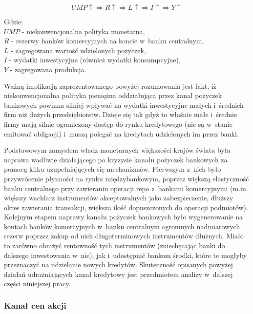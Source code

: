 \begin{equation}
UMP\uparrow \Longrightarrow R\uparrow \Longrightarrow L\uparrow \Longrightarrow I\uparrow \Longrightarrow Y\uparrow	
\end{equation}
\vspace{-1cm}
\begin{adjustwidth}{2.5em}{0pt}
{\footnotesize Gdzie:  \\
$UMP$ - niekonwencjonalna polityka monetarna, \\
$R$ - rezerwy banków komercyjnych na koncie w~banku centralnym, \\
$L$ - zagregowana wartość udzielonych pożyczek, \\
$I$ - wydatki inwestycyjne (również wydatki konsumpcyjne), \\
$Y$ - zagregowana produkcja.}
\end{adjustwidth}
\vspace{0.3cm}

\noindent Ważną implikacją zaprezentowanego powyżej rozumowania jest fakt, iż niekonwencjonalna polityka pieniężna oddziałująca przez kanał pożyczek bankowych powinna silniej wpływać na wydatki inwestycyjne małych i~średnich firm niż dużych przedsiębiorstw. Dzieje się tak gdyż to właśnie małe i~średnie firmy mają silnie ograniczony dostęp do rynku kredytowego (nie są w~stanie emitować obligacji) i~muszą polegać na kredytach udzielonych im przez banki.

Podstawowym zamysłem władz monetarnych większości krajów świata była naprawa wadliwie działającego po kryzysie kanału pożyczek bankowych za pomocą kilku uzupełniających się mechanizmów. Pierwszym z~nich było przywrócenie płynności na rynku międzybankowym, poprzez większą elastyczność banku centralnego przy zawieraniu operacji repo z~bankami komercyjnymi (m.in. większy wachlarz instrumentów akceptowalnych jako zabezpieczenie, dłuższy okres zawierania transakcji, większa ilość dopuszczonych do operacji podmiotów). Kolejnym etapem naprawy kanału pożyczek bankowych było wygenerowanie na kontach banków komercyjnych w~banku centralnym ogromnych nadmiarowych rezerw poprzez zakup od nich długoterminowych instrumentów dłużnych. Miało to zarówno obniżyć rentowność tych instrumentów (zniechęcając banki do dalszego inwestowania w~nie), jak i~udostępnić bankom środki, które te mogłyby przeznaczyć na udzielanie nowych kredytów. Skuteczność opisanych powyżej działań udrażniających kanał kredytowy jest przedmiotem analizy w~dalszej części niniejszej pracy.

\subsubsection*{\normalsize{Kanał cen akcji}}

